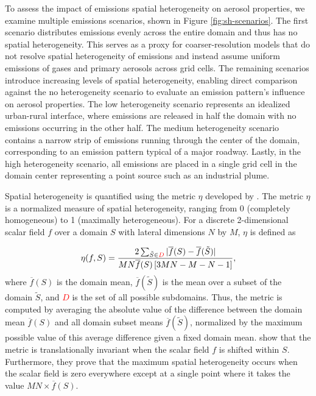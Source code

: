 \documentclass[acp]{copernicus}
\begin{document}
To assess the impact of emissions spatial heterogeneity on aerosol
properties, we examine multiple emissions scenarios, shown in Figure
\ref{fig:sh-scenarios}. The first scenario distributes emissions evenly 
across the entire domain and thus has no spatial heterogeneity. This
serves as a proxy for coarser-resolution models that do not resolve
spatial heterogeneity of emissions and instead assume uniform
emissions of gases and primary aerosols across grid cells. The
remaining scenarios introduce increasing levels of spatial
heterogeneity, enabling direct comparison against the no heterogeneity scenario to evaluate 
an emission pattern's influence on aerosol properties. The low
heterogeneity scenario represents an idealized urban-rural interface, where emissions are
released in half the domain with no emissions occurring in the other
half. The medium heterogeneity scenario contains a narrow strip of emissions running through
the center of the domain, corresponding to an emission pattern typical
of a major roadway. Lastly, in the high heterogeneity scenario, all emissions 
are placed in a single grid cell in the domain center representing a point source such
as an industrial plume.

Spatial heterogeneity is quantified using the metric $\eta$ developed by
\citep{mohebalhojeh_metric_2026}. The metric $\eta$ is a normalized
measure of spatial heterogeneity, ranging from 0 (completely
homogeneous) to 1 (maximally heterogeneous). For a discrete
2-dimensional scalar field $f$ over a domain $S$ with lateral
dimensions $N$ by $M$, $\eta$ is defined as

\begin{equation}
\eta(f, S) = \frac{2\sum_{\tilde{S}\in \textcolor{red}{D}}|\overline{f}(S) - \overline{f}(\tilde{S})|}{MN\overline{f}(S)\left[3MN-M-N-1\right]}, 
\end{equation}
where $\overline{f}(S)$ is the domain mean, $\overline{f}(\tilde{S})$ is the mean over a subset of the domain
$\tilde{S}$, and \textcolor{red}{$D$} is the set of all possible subdomains. Thus, the metric is computed by averaging the absolute
value of the difference between the domain mean $\overline{f}(S)$ and
all domain subset means $\overline{f}(\tilde{S})$, normalized by the
maximum possible value of this average difference given a fixed domain mean. \citet{mohebalhojeh_metric_2026} show that the metric is
translationally invariant when the scalar field $f$ is shifted within
$S$. Furthermore, they prove that the
maximum spatial heterogeneity occurs when the
scalar field is zero everywhere except at a single point
where it takes the value $MN\times\overline{f}(S)$.
\end{document}
